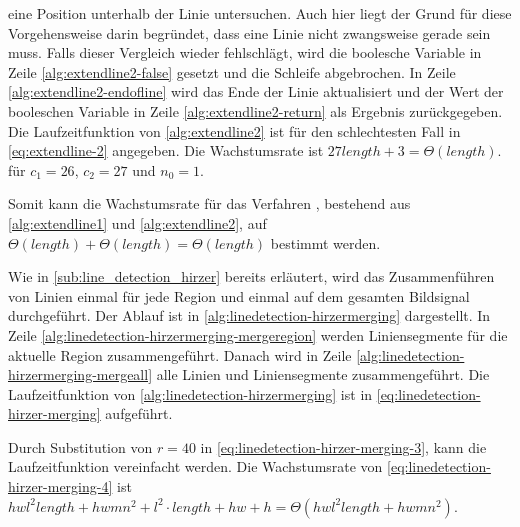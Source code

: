  eine Position unterhalb der Linie untersuchen. Auch hier liegt der Grund für diese Vorgehensweise darin begründet, dass
 eine Linie nicht zwangsweise gerade sein muss. Falls dieser Vergleich wieder fehlschlägt, wird die boolesche Variable
 in Zeile \ref{alg:extendline2-false} gesetzt und die Schleife abgebrochen. In Zeile
 \ref{alg:extendline2-endofline} wird das Ende der Linie aktualisiert und der Wert der booleschen Variable in Zeile
 \ref{alg:extendline2-return} als Ergebnis zurückgegeben. Die Laufzeitfunktion von \autoref{alg:extendline2} ist für
 den schlechtesten Fall in \autoref{eq:extendline-2} angegeben. Die Wachstumsrate ist
 $27 \mathit{length} + 3 = \Theta(\mathit{length})$. für $c_{1} = 26$, $c_{2} = 27$ und $n_{0} = 1$.

Somit kann die Wachstumsrate für das Verfahren , bestehend aus \autoref{alg:extendline1} und
 \autoref{alg:extendline2}, auf $\Theta(\mathit{length}) + \Theta(\mathit{length}) = \Theta(\mathit{length})$ bestimmt
 werden.


Wie in \autoref{sub:line_detection_hirzer} bereits erläutert, wird das Zusammenführen von Linien einmal für jede Region
 und einmal auf dem gesamten Bildsignal durchgeführt. Der Ablauf ist in \autoref{alg:linedetection-hirzermerging} dargestellt.
In Zeile \ref{alg:linedetection-hirzermerging-mergeregion} werden Liniensegmente für die aktuelle Region
 zusammengeführt. Danach wird in Zeile \ref{alg:linedetection-hirzermerging-mergeall} alle Linien und Liniensegmente
 zusammengeführt. Die Laufzeitfunktion von \autoref{alg:linedetection-hirzermerging} ist in
 \autoref{eq:linedetection-hirzer-merging} aufgeführt.

Durch Substitution von $r = 40$ in \autoref{eq:linedetection-hirzer-merging-3}, kann die Laufzeitfunktion vereinfacht
 werden. Die Wachstumsrate von \autoref{eq:linedetection-hirzer-merging-4} ist
$hwl^2\mathit{length} + hwmn^2 + l^2\cdot\mathit{length} + hw + h = \Theta(hwl^2\mathit{length} + hwmn^2)$.